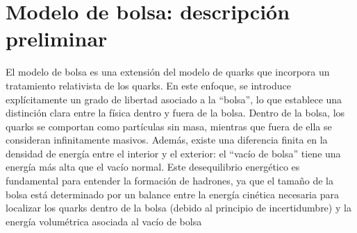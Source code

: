 %
%
%
%


\section{Modelo de bolsa: descripción preliminar}

El modelo de bolsa es una extensión del modelo de quarks que incorpora un tratamiento relativista de los quarks. En este enfoque, se introduce explícitamente un grado de libertad asociado a la  ``bolsa'', lo que establece una distinción clara entre la física dentro y fuera de la bolsa. Dentro de la bolsa, los quarks se comportan como partículas sin masa, mientras que fuera de ella se consideran infinitamente masivos. Además, existe una diferencia finita en la densidad de energía entre el interior y el exterior: el ``vacío de bolsa'' tiene una energía más alta que el vacío normal. Este desequilibrio energético es fundamental para entender la formación de hadrones, ya que el tamaño de la bolsa está determinado por un balance entre la energía cinética necesaria para localizar los quarks dentro de la bolsa (debido al principio de incertidumbre) y la energía volumétrica asociada al vacío de bolsa %

